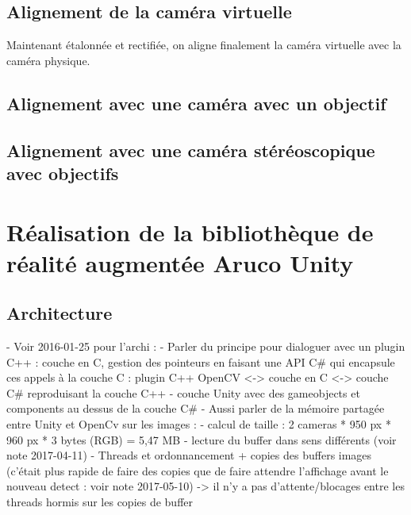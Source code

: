 \subsection{Alignement de la caméra virtuelle}
\label{subsec:virtual_camera_alignement}
Maintenant étalonnée et rectifiée, on aligne finalement la caméra virtuelle avec la caméra physique.

\subsection{Alignement avec une caméra avec un objectif }
\label{subsec:fisheye_camera_calibration}

\subsection{Alignement avec une caméra stéréoscopique avec objectifs }
\label{subsec:stereo_camera_calibration}


\section{Réalisation de la bibliothèque de réalité augmentée Aruco Unity}
\label{sec:aruco_unity}

\subsection{Architecture}
- Voir 2016-01-25 pour l'archi :
  - Parler du principe pour dialoguer avec un plugin C++ : couche en C, gestion des pointeurs en faisant une API C\# qui encapsule ces appels à la couche C : plugin C++ OpenCV <-> couche en C <-> couche C\# reproduisant la couche C++ 
  - couche Unity avec des gameobjects et components au dessus de la couche C\#
- Aussi parler de la mémoire partagée entre Unity et OpenCv sur les images :
  - calcul de taille : 2 cameras * 950 px * 960 px * 3 bytes (RGB) = 5,47 MB
  - lecture du buffer dans sens différents (voir note 2017-04-11)
  - Threads et ordonnancement + copies des buffers images (c'était plus rapide de faire des copies que de faire attendre l'affichage avant le nouveau detect : voir note 2017-05-10) -> il n'y a pas d'attente/blocages entre les threads hormis sur les copies de buffer

